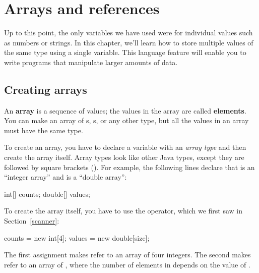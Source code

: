 \chapter{Arrays and references}
\label{arrays}


Up to this point, the only variables we have used were for individual values such as numbers or strings.
In this chapter, we'll learn how to store multiple values of the same type using a single variable.
This language feature will enable you to write programs that manipulate larger amounts of data.


\section{Creating arrays}


An {\bf array} is a sequence of values; the values in the array are called {\bf elements}.
You can make an array of s, s, or any other type, but all the values in an array must have the same type.


To create an array, you have to declare a variable with an {\em array type} and then create the array itself.
Array types look like other Java types, except they are followed by square brackets (\java{[]}).
For example, the following lines declare that  is an ``integer array'' and  is a ``double array'':

\begin{code}
int[] counts;
double[] values;
\end{code}


To create the array itself, you have to use the  operator, which we first saw in Section~\ref{scanner}:

\begin{code}
counts = new int[4];
values = new double[size];
\end{code}

The first assignment makes  refer to an array of four integers.
The second makes  refer to an array of , where the number of elements in  depends on the value of .

